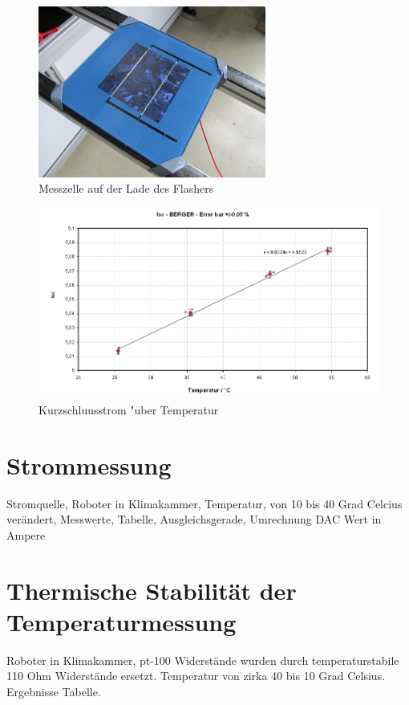 \documentclass[a4paper,bibtotoc,oneside]{scrbook}
\begin{document}
\begin{figure}[htbp]
\centering
\includegraphics[width=75mm]{img/zelle.jpg}
\caption[Messzelle auf der Lade des Flashers]{Messzelle auf der Lade des Flashers}\label{zelleflasher}
\end{figure}

\begin{figure}[htbp]
\centering
\includegraphics[width=150mm]{img/tempkoef.png}
\caption[Kurzschlusstrom "uber Temperatur]{Kurzschluusstrom "uber Temperatur}\label{tempkoef}
\end{figure}

\section{Strommessung}\thispagestyle{empty}

Stromquelle, Roboter in Klimakammer, Temperatur, von 10 bis 40 Grad Celcius verändert,
Messwerte, Tabelle, Ausgleichsgerade, Umrechnung DAC Wert in Ampere

\section{Thermische Stabilität der Temperaturmessung}\thispagestyle{empty}
Roboter in Klimakammer, pt-100 Widerstände wurden durch temperaturstabile 110 Ohm Widerstände ersetzt. Temperatur von zirka 40 bis 10 Grad Celsius.
Ergebnisse Tabelle. 
\end{document}
